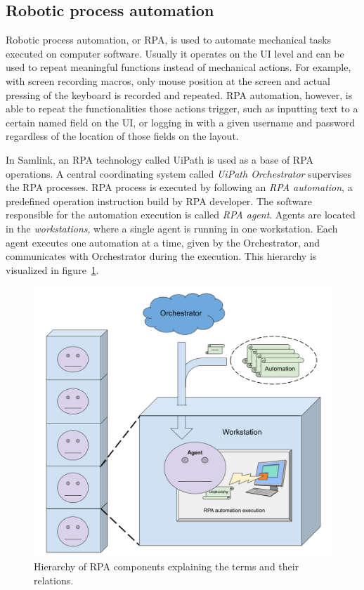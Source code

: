 \subsection{Robotic process automation}\label{subsec:bg-rpa}

Robotic process automation, or RPA,
is used to automate mechanical tasks executed on computer software.
Usually it operates on the UI level
and can be used to repeat meaningful functions
instead of mechanical actions.
For example, with screen recording macros,
only mouse position at the screen and actual pressing of the keyboard
is recorded and repeated.
RPA automation, however,
is able to repeat the functionalities those actions trigger,
such as inputting text to a certain named field on the UI,
or logging in with a given username and password
regardless of the location of those fields on the layout.~\cite{tripathi2018learning}

In Samlink,
an RPA technology called UiPath is used as a base of RPA operations.
A central coordinating system called \textit{UiPath Orchestrator}
supervises the RPA processes.
RPA process is executed by following
an \textit{RPA automation},
a predefined operation instruction build by RPA developer.
The software responsible for the automation execution
is called \textit{RPA agent}.
Agents are located in the \textit{workstations},
where a single agent is running in one workstation.
Each agent executes one automation at a time,
given by the Orchestrator,
and communicates with Orchestrator during the execution.
This hierarchy is visualized in figure~\ref{fig:rpa-hierarchy}.

\begin{figure}[htb]
    \centering
    \includegraphics[width=\textwidth,]{./appendices/RPA-hierarchy}
    \caption{Hierarchy of RPA components explaining the terms and their relations.
    \label{fig:rpa-hierarchy}}
\end{figure}


